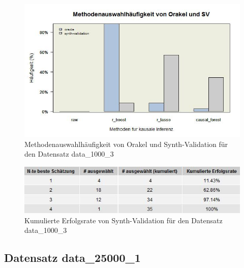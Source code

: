 \documentclass[12pt,a4paper,twoside]{scrartcl}
\numberwithin{equation}{section}
\newcounter{mypagecount}%
\newenvironment{interlude}{%
  \clearpage
  \setcounter{mypagecount}{\value{page}}%
  \thispagestyle{empty}%
  \pagestyle{empty}%
}{%
  \clearpage
  \setcounter{page}{\value{mypagecount}}%
}
\begin{document}
\begin{interlude}
\begin{appendices}
\begin{center}
\begin{figure}[H]
    \centering
    \includegraphics[height=0.5\textwidth, width=1\textwidth]{figures/plots/appendix/rawData1000cBarplot.jpeg}
    \caption[Methodenauswahlhäufigkeit von Orakel und Synth-Validation für den Datensatz data\_1000\_3]{Methodenauswahlhäufigkeit von Orakel und Synth-Validation für den Datensatz data\_1000\_3}
  \end{figure}
\end{center}

\begin{center}
\begin{figure}[H]
    \centering
    \includegraphics[height=0.2\textwidth, width=1\textwidth]{figures/plots/appendix/rawData1000cGrid.jpeg}
    \vspace{1mm}
    \caption[Kumulierte Erfolgsrate von Synth-Validation für den Datensatz data\_1000\_3]{Kumulierte Erfolgsrate von Synth-Validation für den Datensatz data\_1000\_3}
  \end{figure}
\end{center}

\subsection{Datensatz data\_25000\_1}


\end{appendices}
\end{interlude}
\end{document}
